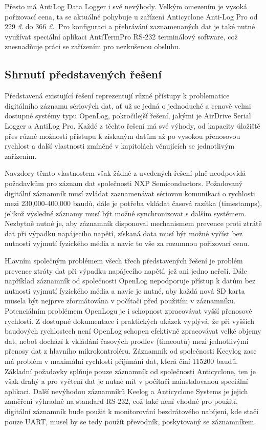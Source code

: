 Přesto má AntiLog Data Logger i své nevýhody. Velkým omezením je vysoká pořizovací cena, ta se aktuálně pohybuje u zařízení Anticyclone Anti-Log Pro od 229 £ do 366 £. Pro konfiguraci a přehrávání zaznamenaných dat je také nutné využívat speciální aplikaci AntiTermPro RS-232 terminálový software, což znesnadňuje práci se zařízením pro nezkušenou obsluhu.  \cite{anticyclone_systems_antilog_pro, anticyclone_systems_antilog_pro_price}

\subsection{Shrnutí představených řešení}

Představená existující řešení reprezentují různé přístupy k problematice digitálního záznamu sériových dat, ať už se jedná o jednoduché a cenově velmi dostupné systémy typu OpenLog, pokročilejší řešení, jakými je  AirDrive Serial Logger a AntiLog Pro. Každé z těchto řešení má své výhody, od kapacity úložiště přes různé možnosti přístupu k získaným datům až po vysokou přenosovou rychlost a další vlastnosti zmíněné v kapitolách věnujících se jednotlivým zařízením.

Navzdory těmto vlastnostem však žádné z uvedených řešení plně neodpovídá požadavkům pro záznam dat společnosti NXP Semiconductors. Požadovaný digitální záznamník musí zvládat zaznamenávat sériovou komunikaci o rychlosti mezi 230,000-400,000 baudů, dále je potřeba vkládat časová razítka (timestamps), jelikož výsledné záznamy musí být možné synchronizovat s dalším systémem. Nezbytně nutné je, aby záznamník disponoval mechanismem prevence proti ztrátě dat při výpadku napájecího napětí, získaná data musí být možné vyčíst bez nutnosti vyjmutí fyzického média a navíc to vše za rozumnou pořizovací cenu.

Hlavním společným problémem všech třech představených řešení je problém prevence ztráty dat při výpadku napájecího napětí, jež ani jedno neřeší. Dále například záznamník od společnosti OpenLog nepodporuje přístup k datům bez nutnosti vyjmutí fyzického média a navíc je nutné, aby každá nová SD karta musela být nejprve zformátována v počítači před použitím v záznamníku. Potenciálním problémem OpenLogu je i schopnost zpracovávat vyšší přenosové rychlosti. Z dostupné dokumentace i praktických ukázek vyplývá, že při vyšších baudových rychlostech není OpenLog schopen efektivně zpracovávat velké objemy dat, neboť dochází k vkládání časových prodlev (timeoutů) mezi jednotlivými přenosy dat z hlavního mikrokontroléru. Záznamník od společnosti Keeylog zase má problém v maximální rychlosti přijímání dat, která činí 115200 baudů. Základní požadavky splňuje pouze záznamník od společnosti Anticyclone, ten je však drahý a pro vyčtení dat je nutné mít v počítači nainstalovanou speciální aplikaci. Další nevýhodou záznamníků Keelog a Anticyclone Systems je jejich zaměření výhradně na standard RS-232, což také není vhodné pro použití, digitální záznamník bude použit k monitorování bezdrátového nabíjení, kde stačí pouze UART, musel by se tedy použít převodník, poskytovaný se záznamníkem.

